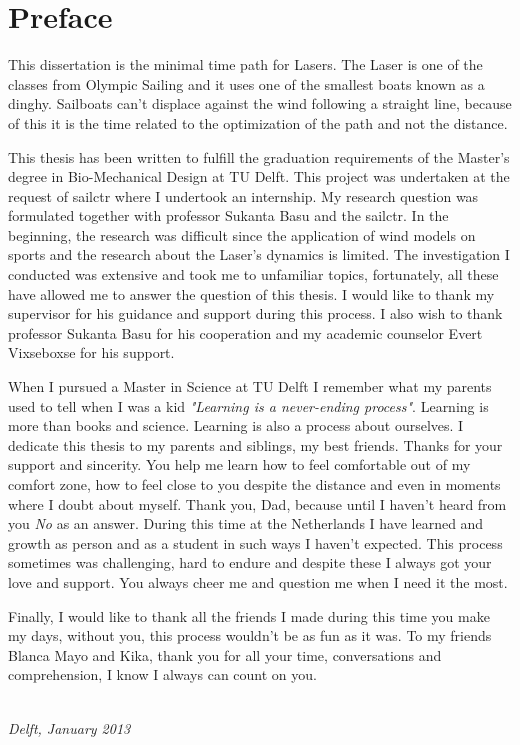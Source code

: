 \chapter*{Preface}

This dissertation is the minimal time path for Lasers. The Laser is one of the classes from Olympic Sailing and it uses one of the smallest boats known as a dinghy. Sailboats can't displace against the wind following a straight line, because of this it is the time related to the optimization of the path and not the distance.  \par 

This thesis has been written to fulfill the graduation requirements of the Master's degree in Bio-Mechanical Design at TU Delft. This project was undertaken at the request of \acrlong{sailctr} where I undertook an internship. My research question was formulated together with professor Sukanta Basu and the \acrshort{sailctr}. In the beginning, the research was difficult since the application of wind models on sports and the research about the Laser's dynamics is limited. The investigation I conducted was extensive and took me to unfamiliar topics, fortunately, all these have allowed me to answer the question of this thesis. I would like to thank my supervisor for his guidance and support during this process. I also wish to thank professor Sukanta Basu for his cooperation and my academic counselor Evert Vixseboxse for his support. \par 

When I pursued a Master in Science at TU Delft I remember what my parents used to tell when I was a kid \textit{"Learning is a never-ending process"}. Learning is more than books and science. Learning is also a process about ourselves. I dedicate this thesis to my parents and siblings, my best friends. Thanks for your support and sincerity. You help me learn how to feel comfortable out of my comfort zone, how to feel close to you despite the distance and even in moments where I doubt about myself. Thank you, Dad, because until I haven't heard from you \textit{No} as an answer. During this time at the Netherlands I have learned and growth as person and as a student in such ways I haven't expected. This process sometimes was challenging, hard to endure and despite these I always got your love and support. You always cheer me and question me when I need it the most. \par 
Finally, I would like to thank all the friends I made during this time you make my days, without you, this process wouldn't be as fun as it was. To my friends Blanca Mayo and Kika, thank you for all your time, conversations and comprehension, I know I always can count on you.\par

\begin{flushright}
{\makeatletter\itshape
    \@firstname\ \@lastname \\
    Delft, January 2013
\makeatother}
\end{flushright}

